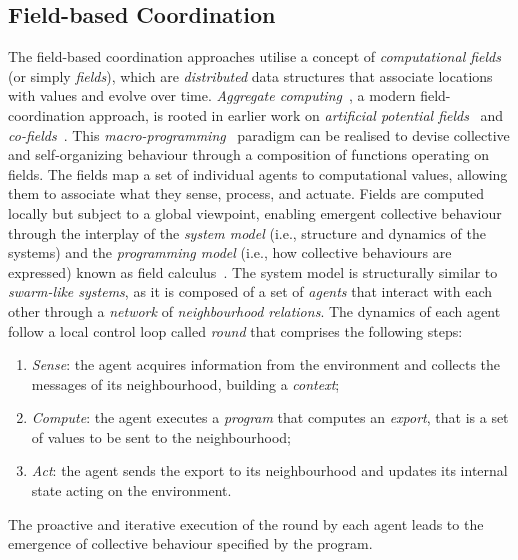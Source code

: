 \documentclass[conference]{IEEEtran}
\begin{document}
\subsection{Field-based Coordination}
The field-based coordination approaches utilise a concept of \emph{computational fields} 
 (or simply \emph{fields}), 
 which are \emph{distributed} data structures that associate locations with values and evolve over time. 
%
\emph{Aggregate computing}~\cite{Beal2015Computer}, a modern field-coordination approach, is rooted in earlier work on \emph{artificial potential fields}~\cite{DBLP:conf/icra/Warren89} and \emph{co-fields}~\cite{DBLP:journals/pervasive/MameiZL04}. 
% 
This \emph{macro-programming}~\cite{DBLP:journals/corr/abs-2201-03473} paradigm can be realised to devise collective and self-organizing behaviour through a composition of functions operating on fields. 
%
The fields map a set of individual agents to computational values, 
 allowing them to associate what they sense, process, and actuate. 
%
Fields are computed locally but subject to a global viewpoint, 
 enabling emergent collective behaviour through the interplay of the \emph{system model} (i.e., structure and dynamics of the systems)
 and the \emph{programming model} (i.e., how collective behaviours are expressed) known as field calculus~\cite{DBLP:conf/esocc/ViroliDB13,DBLP:journals/corr/ViroliADPB16,DBLP:journals/tocl/AudritoVDPB19}.
%
The system model is structurally similar to \emph{swarm-like systems}, 
 as it is composed of a set of \emph{agents} 
 that interact with each other through a \emph{network} of \emph{neighbourhood relations}.
%
The dynamics of each agent follow a local control loop called \emph{round}
 that comprises the following steps:
\begin{enumerate}
  \item \emph{Sense}: the agent acquires information from the environment and collects the messages of its neighbourhood, building a \emph{context};
  \item \emph{Compute}: the agent executes a \emph{program} that computes an \emph{export}, that is a set of values to be sent to the neighbourhood;
  \item \emph{Act}: the agent sends the export to its neighbourhood and updates its internal state acting on the environment.
\end{enumerate}
The proactive and iterative execution of the round by each agent leads to the emergence of collective behaviour specified by the program.
\end{document}
